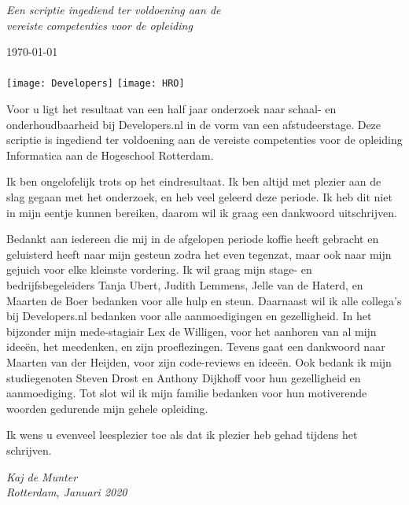 \documentclass[
11pt, %
oneside, %
english, %
singlespacing, %
parskip, %
headsepline, %
]{formatting} %
\begin{document}
\begin{titlepage}
\begin{center}
		\vfill
		
		\large \textit{Een scriptie ingediend ter voldoening aan de\\ vereiste competenties voor de opleiding \degreename}\\[0.3cm]
		
		\deptname %
		
		\vfill
		
		{\large \today}\\[0.5cm] %
		{\Large \texttt{\versionnr}}\\[1cm]
		
		\texttt{[image: Developers]} \hspace{3cm}
		\texttt{[image: HRO]}

		\vfill
	\end{center}
\end{titlepage}


\begin{voorwoord}
	Voor u ligt het resultaat van een half jaar onderzoek naar schaal- en onderhoudbaarheid bij Developers.nl in de vorm van een afstudeerstage. Deze scriptie is ingediend ter voldoening aan de vereiste competenties voor de opleiding Informatica aan de Hogeschool Rotterdam.
	
	Ik ben ongelofelijk trots op het eindresultaat. Ik ben altijd met plezier aan de slag gegaan met het onderzoek, en heb veel geleerd deze periode. Ik heb dit niet in mijn eentje kunnen bereiken, daarom wil ik graag een dankwoord uitschrijven.
	
	Bedankt aan iedereen die mij in de afgelopen periode koffie heeft gebracht en geluisterd heeft naar mijn gesteun zodra het even tegenzat, maar ook naar mijn gejuich voor elke kleinste vordering. Ik wil graag mijn stage- en bedrijfsbegeleiders Tanja Ubert, Judith Lemmens, Jelle van de Haterd, en Maarten de Boer bedanken voor alle hulp en steun. Daarnaast wil ik alle collega's bij Developers.nl bedanken voor alle aanmoedigingen en gezelligheid. In het bijzonder mijn mede-stagiair Lex de Willigen, voor het aanhoren van al mijn ideeën, het meedenken, en zijn proeflezingen. Tevens gaat een dankwoord naar Maarten van der Heijden, voor zijn code-reviews en ideeën. Ook bedank ik mijn studiegenoten Steven Drost en Anthony Dijkhoff voor hun gezelligheid en aanmoediging. Tot slot wil ik mijn familie bedanken voor hun motiverende woorden gedurende mijn gehele opleiding.
	
	Ik wens u evenveel leesplezier toe als dat ik plezier heb gehad tijdens het schrijven.
	\begin{flushright}
		\textit{Kaj de Munter\\
		Rotterdam, Januari 2020}
	\end{flushright}
\end{voorwoord}
\end{document}
